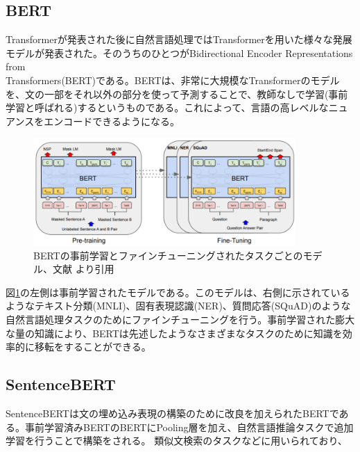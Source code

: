 \subsection{BERT}
Transformerが発表された後に自然言語処理ではTransformerを用いた様々な発展モデルが発表された。そのうちのひとつがBidirectional Encoder Representations from \\Transformers(BERT)\cite{https://doi.org/10.48550/arxiv.1810.04805}である。BERTは、非常に大規模なTransformerのモデルを、文の一部をそれ以外の部分を使って予測することで、教師なしで学習(事前学習と呼ばれる)するというものである。これによって、言語の高レベルなニュアンスをエンコードできるようになる\cite{Sowmya_Vajjala2022-02-04}。
\begin{figure}[h]
  \begin{center}
      \includegraphics[width=10cm]{img/BERT-method.png}
      \caption{BERTの事前学習とファインチューニングされたタスクごとのモデル、文献\cite{https://doi.org/10.48550/arxiv.1810.04805} より引用}
      \label{img:BERT-method}
  \end{center}
\end{figure}
図\ref{img:BERT-method}の左側は事前学習されたモデルである。このモデルは、右側に示されているようなテキスト分類(MNLI)、固有表現認識(NER)、質問応答(SQuAD)のような自然言語処理タスクのためにファインチューニングを行う。事前学習された膨大な量の知識により、BERTは先述したようなさまざまなタスクのために知識を効率的に移転をすることができる。


\subsection{SentenceBERT}
SentenceBERT\cite{arxiv.1908.10084}は文の埋め込み表現の構築のために改良を加えられたBERTである。事前学習済みBERTのBERTにPooling層を加え、自然言語推論タスクで追加学習を行うことで構築をされる。
類似文検索のタスクなどに用いられており、
